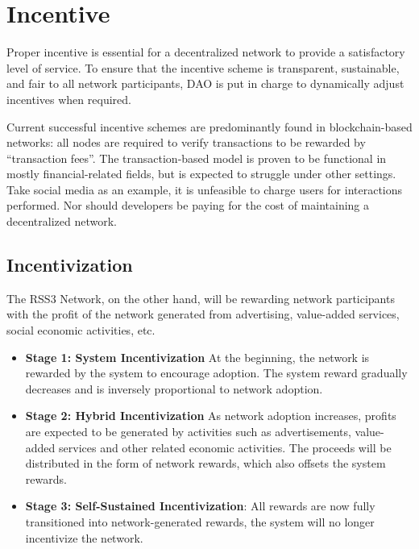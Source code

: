 \section{Incentive}

Proper incentive is essential for a decentralized network to provide a satisfactory level of service. To ensure that the incentive scheme is transparent, sustainable, and fair to all network participants, DAO is put in charge to dynamically adjust incentives when required.

Current successful incentive schemes are predominantly found in blockchain-based networks: all nodes are required to verify transactions to be rewarded by ``transaction fees''. The transaction-based model is proven to be functional in mostly financial-related fields, but is expected to struggle under other settings. Take social media as an example, it is unfeasible to charge users for interactions performed. Nor should developers be paying for the cost of maintaining a decentralized network.

\subsection{Incentivization}

The RSS3 Network, on the other hand, will be rewarding network participants with the profit of the network generated from advertising, value-added services, social economic activities, etc.

\begin{itemize}
    \item \textbf{Stage 1: System Incentivization} At the beginning, the network is rewarded by the system to encourage adoption. The system reward gradually decreases and is inversely proportional to network adoption.
    
    \item \textbf{Stage 2: Hybrid Incentivization} As network adoption increases, profits are expected to be generated by activities such as advertisements, value-added services and other related economic activities. The proceeds will be distributed in the form of network rewards, which also offsets the system rewards.

    \item \textbf{Stage 3: Self-Sustained Incentivization}: All rewards are now fully transitioned into network-generated rewards, the system will no longer incentivize the network. 
\end{itemize}

